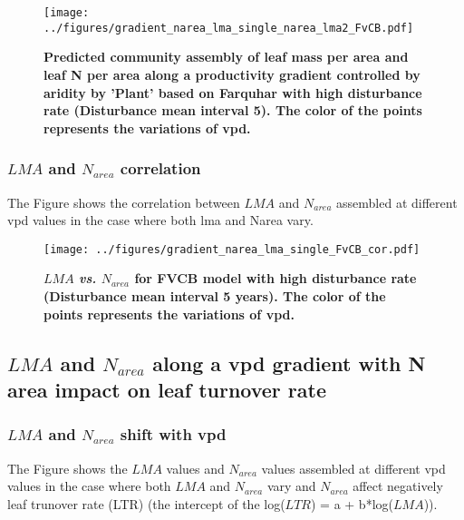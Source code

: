 \documentclass[a4paper,11pt]{article}
\begin{document}
\begin{figure}[H]
\centering
\texttt{[image: ../figures/gradient\_narea\_lma\_single\_narea\_lma2\_FvCB.pdf]}
\caption{\textbf{Predicted community assembly of leaf mass per area and leaf N per area along a productivity gradient controlled by aridity by 'Plant' based on Farquhar with high disturbance rate (Disturbance mean interval 5). The color of
    the points represents the variations of vpd.}
\label{fig:lma_nareaFh2}}
\end{figure}


\subsubsection{$LMA$ and $N_{area}$ correlation}

The Figure \label{fig:lma_narea_cor_single} shows the correlation
between $LMA$ and $N_{area}$ assembled at different
vpd values in the case where both lma and Narea vary.

\begin{figure}[H]
\centering
\texttt{[image: ../figures/gradient\_narea\_lma\_single\_FvCB\_cor.pdf]}
\caption{\textbf{$LMA$ \textit{vs.} $N_{area}$ for FVCB model with high
    disturbance rate (Disturbance mean interval 5 years). The color of
    the points represents the variations of vpd.}
\label{fig:lma_narea_cor_single}}
\end{figure}


\pagebreak[4]

\subsection{$LMA$ and $N_{area}$ along a vpd gradient with N area impact on leaf turnover rate}


\subsubsection{$LMA$ and $N_{area}$ shift with vpd}
The Figure \label{fig:lma_nareaFh2_NvLTR} shows the $LMA$ values and $N_{area}$  values assembled at different
vpd values in the case where both $LMA$ and $N_{area}$ vary and $N_{area}$ affect
negatively leaf trunover rate (LTR)  (the intercept of the log($LTR$) =
a + b*log($LMA$)).

\end{document}
